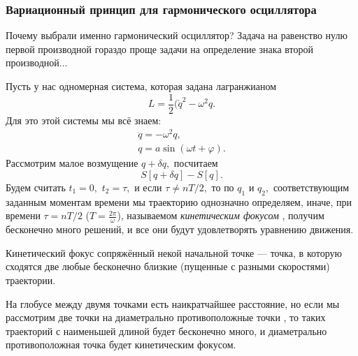 \subsubsection{Вариационный принцип для гармонического осциллятора}
Почему выбрали именно гармонический осциллятор? Задача на равенство нулю первой производной гораздо проще задачи на определение знака второй производной...

Пусть у нас одномерная система, которая задана лагранжианом
\[L = \frac{1}{2} (\dot{q}^2 - \omega^2 q.\]
Для это этой системы мы всё знаем:
\begin{gather}
\ddot{q} = -\omega^2 q,\\
q = a\sin (\omega t + \varphi).
\end{gather}
Рассмотрим малое возмущение $q+\delta q,$ посчитаем
\begin{equation}
S[q+\delta q] - S[q]. \label{functional_1}
\end{equation}
Будем считать $t_1 = 0,$ $t_2 = \tau,$ и если $\tau \neq n T/2,$ то по $q_1$ и $q_2,$ соответствующим заданным моментам времени мы траекторию однозначно определяем, иначе, при времени $\tau = n T/2$ ($T = \frac{2\pi}{\omega}$), называемом \textit{кинетическим фокусом} ,  получим бесконечно много решений, и все они будут удовлетворять уравнению движения. 
\begin{dfn}
Кинетический фокус сопряжённый некой начальной точке --- точка, в которую сходятся  две любые бесконечно близкие (пущенные с разными скоростями) траектории.
\end{dfn}

\begin{ex}
На глобусе между двумя точками есть наикратчайшее расстояние, но если мы рассмотрим две точки на диаметрально противоположные точки , то таких траекторий с наименьшей длиной будет бесконечно много, и диаметрально противоположная точка будет кинетическим фокусом.
\end{ex}

